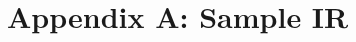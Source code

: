 \documentclass{article}
\begin{document}
\section{Appendix A: Sample IR}
\label{sec:AppendixA}

\vspace{0.125in}



\clearpage




\end{document}
